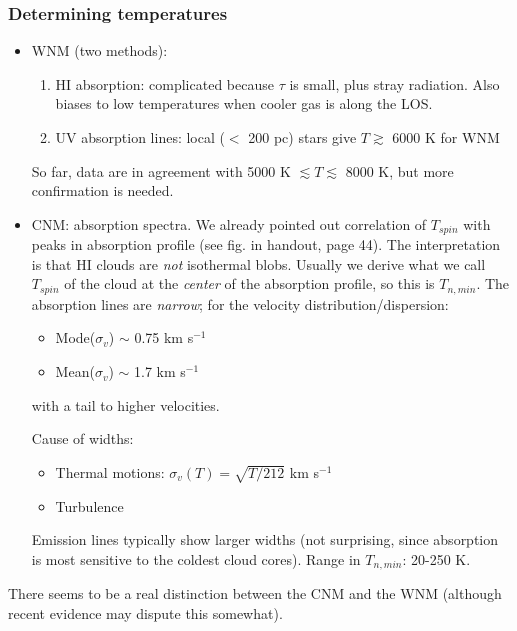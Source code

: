 \documentclass[11pt]{article}
\newcommand{\mar}[1]{\hspace{0pt}\marginpar{-\textcolor{black}{#1}-}}
\begin{document}
\subsubsection{Determining temperatures}
\begin{itemize}
    \item WNM (two methods):
        \begin{enumerate}%
            \item HI absorption: complicated because $\tau$ is small, plus
                stray radiation. Also biases to low temperatures when cooler
                gas is along the LOS\@.
            \item UV absorption lines: local ($<$ 200 pc) stars give $T
                \gtrsim$ 6000 K for WNM
        \end{enumerate}
        So far, data are in agreement with 5000 K $\lesssim T \lesssim$
        8000 K, but more confirmation is needed.
    \item CNM: absorption spectra. We already pointed out correlation of
        $T_{spin}$ with peaks in absorption profile (see fig. in handout, page
        44). The interpretation is that HI clouds are \emph{not} isothermal
        blobs. Usually we derive what we call $T_{spin}$ of the cloud at the
        \emph{center} of the absorption profile, so this is $T_{n, min}$.
        \mar{50}The absorption lines are \emph{narrow}; for the
        velocity distribution/dispersion:
        \begin{itemize}
            \item Mode($\sigma_{v}$) $\sim$ 0.75 km s$^{-1}$
            \item Mean($\sigma_{v}$) $\sim$ 1.7 km s$^{-1}$
        \end{itemize}
        with a tail to higher velocities.

        Cause of widths:
        \begin{itemize}
            \item Thermal motions:
                $\sigma_{v}(T) = \sqrt{T/212}$ km s$^{-1}$
            \item Turbulence
        \end{itemize}
        Emission lines typically show larger widths (not surprising, since
        absorption is most sensitive to the coldest cloud cores). Range in
        $T_{n,min}$: 20-250 K.
\end{itemize}
There seems to be a real distinction between the CNM and the WNM
(although recent evidence may dispute this somewhat).
\end{document}
